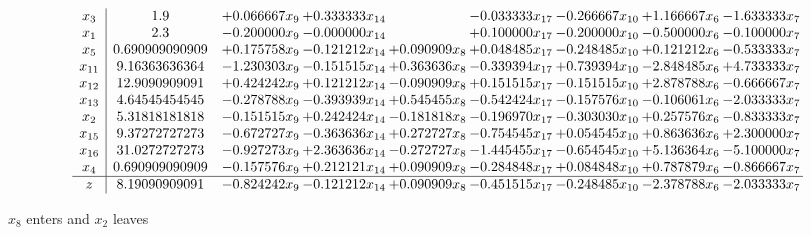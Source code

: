 \documentclass[10pt]{article}
\begin{document}
 \[\begin{array}{c| c c@{\hskip 2pt} c@{\hskip 2pt} c@{\hskip 2pt} c@{\hskip 2pt} c@{\hskip 2pt} c@{\hskip 2pt} c@{\hskip 2pt} }
 x_{3}   &  1.9 & + 0.066667 x_{9} & + 0.333333 x_{14} &   & -0.033333 x_{17} & -0.266667 x_{10} & + 1.166667 x_{6} & -1.633333 x_{7}\\
 x_{1}   &  2.3 & -0.200000 x_{9} & -0.000000 x_{14} &   & + 0.100000 x_{17} & -0.200000 x_{10} & -0.500000 x_{6} & -0.100000 x_{7}\\
 x_{5}   &  0.690909090909 & + 0.175758 x_{9} & -0.121212 x_{14} & + 0.090909 x_{8} & + 0.048485 x_{17} & -0.248485 x_{10} & + 0.121212 x_{6} & -0.533333 x_{7}\\
 x_{11}   &  9.16363636364 & -1.230303 x_{9} & -0.151515 x_{14} & + 0.363636 x_{8} & -0.339394 x_{17} & + 0.739394 x_{10} & -2.848485 x_{6} & + 4.733333 x_{7}\\
 x_{12}   &  12.9090909091 & + 0.424242 x_{9} & + 0.121212 x_{14} & -0.090909 x_{8} & + 0.151515 x_{17} & -0.151515 x_{10} & + 2.878788 x_{6} & -0.666667 x_{7}\\
 x_{13}   &  4.64545454545 & -0.278788 x_{9} & -0.393939 x_{14} & + 0.545455 x_{8} & -0.542424 x_{17} & -0.157576 x_{10} & -0.106061 x_{6} & -2.033333 x_{7}\\
 x_{2}   &  5.31818181818 & -0.151515 x_{9} & + 0.242424 x_{14} & -0.181818 x_{8} & -0.196970 x_{17} & -0.303030 x_{10} & + 0.257576 x_{6} & -0.833333 x_{7}\\
 x_{15}   &  9.37272727273 & -0.672727 x_{9} & -0.363636 x_{14} & + 0.272727 x_{8} & -0.754545 x_{17} & + 0.054545 x_{10} & + 0.863636 x_{6} & + 2.300000 x_{7}\\
 x_{16}   &  31.0272727273 & -0.927273 x_{9} & + 2.363636 x_{14} & -0.272727 x_{8} & -1.445455 x_{17} & -0.654545 x_{10} & + 5.136364 x_{6} & -5.100000 x_{7}\\
 x_{4}   &  0.690909090909 & -0.157576 x_{9} & + 0.212121 x_{14} & + 0.090909 x_{8} & -0.284848 x_{17} & + 0.084848 x_{10} & + 0.787879 x_{6} & -0.866667 x_{7}\\
\hline
z    &  8.19090909091 & -0.824242 x_{9} & -0.121212 x_{14} & + 0.090909 x_{8} & -0.451515 x_{17} & -0.248485 x_{10} & -2.378788 x_{6} & -2.033333 x_{7}\\
\end{array}\]


 $ x_{8} $ enters and $ x_{2} $ leaves 
\end{document}
